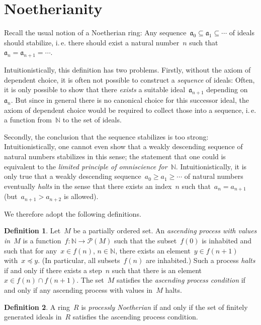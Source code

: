\documentclass[10pt]{amsart}
\makeatletter
\theoremstyle{definition}
\newtheorem{defn}{Definition}[section]
\theoremstyle{plain}
\theoremstyle{remark}
\renewcommand{\P}{\mathcal{P}}
\newcommand{\NN}{\mathbb{N}}
\newcommand{\aaa}{\mathfrak{a}}
\newcommand{\?}{\,{:}\,}
\renewcommand{\_}{\mathpunct{.}\,}
\newcommand{\ie}{i.\,e.\@\xspace}
\makeatother
\begin{document}
\appendix

\section{Noetherianity}

Recall the usual notion of a Noetherian ring: Any sequence~$\aaa_0 \subseteq
\aaa_1 \subseteq \cdots$ of ideals should stabilize, \ie there should exist a
natural number~$n$ such that~$\aaa_n = \aaa_{n+1} = \cdots$.

Intuitionistically, this definition has two problems. Firstly, without the
axiom of dependent choice, it is often not possible to construct a
\emph{sequence} of ideals: Often, it is only possible to show that there
\emph{exists} a suitable ideal~$\aaa_{n+1}$ depending on~$\aaa_n$. But since in
general there is no canonical choice for this successor ideal, the axiom of dependent choice
would be required to collect those into a sequence, \ie a function from~$\NN$
to the set of ideals.

Secondly, the conclusion that the sequence stabilizes is too strong:
Intuitionistically, one cannot even show that a weakly descending sequence of
natural numbers stabilizes in this sense; the statement that one could is
equivalent to the \emph{limited principle of omniscience for~$\NN$}.
Intuitionistically, it is only true that a weakly descending sequence~$a_0 \geq
a_1 \geq \cdots$ of natural numbers eventually \emph{halts} in the sense that
there exists an index~$n$ such that~$a_n = a_{n+1}$ (but~$a_{n+1} > a_{n+2}$ is
allowed).

We therefore adopt the following definitions.

\begin{defn}Let~$M$ be a partially ordered set. An \emph{ascending process
with values in~$M$} is a function~$f : \NN \to \P(M)$ such that
the subset~$f(0)$ is inhabited and such that for any~$x \in f(n)$, $n \in \NN$,
there exists an element~$y \in f(n+1)$ with~$x \preceq y$. (In particular, all
subsets~$f(n)$ are inhabited.) Such a process \emph{halts} if and only if there
exists a step~$n$ such that there is an element~$x \in f(n) \cap f(n+1)$. The
set~$M$ satisfies the \emph{ascending process condition} if and only if any
ascending process with values in~$M$ halts.
\end{defn}

\begin{defn}A ring~$R$ is \emph{processly Noetherian} if and only if the
set of finitely generated ideals in~$R$ satisfies the ascending process
condition.\end{defn}
\end{document}
